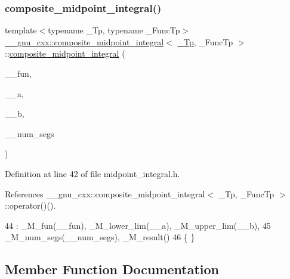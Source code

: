 \subsubsection{\texorpdfstring{composite\+\_\+midpoint\+\_\+integral()}{composite\_midpoint\_integral()}}
{\footnotesize\ttfamily template$<$typename \+\_\+\+Tp, typename \+\_\+\+Func\+Tp$>$ \\
\hyperlink{class____gnu__cxx_1_1composite__midpoint__integral}{\+\_\+\+\_\+gnu\+\_\+cxx\+::composite\+\_\+midpoint\+\_\+integral}$<$ \hyperlink{namespace____gnu__cxx_a3b19a9c800ca194374ef9172290f7d79}{\+\_\+\+Tp}, \+\_\+\+Func\+Tp $>$\+::\hyperlink{class____gnu__cxx_1_1composite__midpoint__integral}{composite\+\_\+midpoint\+\_\+integral} (\begin{DoxyParamCaption}\item[{\+\_\+\+Func\+Tp}]{\+\_\+\+\_\+fun,  }\item[{\hyperlink{namespace____gnu__cxx_a3b19a9c800ca194374ef9172290f7d79}{\+\_\+\+Tp}}]{\+\_\+\+\_\+a,  }\item[{\hyperlink{namespace____gnu__cxx_a3b19a9c800ca194374ef9172290f7d79}{\+\_\+\+Tp}}]{\+\_\+\+\_\+b,  }\item[{std\+::size\+\_\+t}]{\+\_\+\+\_\+num\+\_\+segs }\end{DoxyParamCaption})\hspace{0.3cm}{\ttfamily [inline]}}



Definition at line 42 of file midpoint\+\_\+integral.\+h.



References \+\_\+\+\_\+gnu\+\_\+cxx\+::composite\+\_\+midpoint\+\_\+integral$<$ \+\_\+\+Tp, \+\_\+\+Func\+Tp $>$\+::operator()().


\begin{DoxyCode}
44       : \_M\_fun(\_\_fun), \_M\_lower\_lim(\_\_a), \_M\_upper\_lim(\_\_b),
45         \_M\_num\_segs(\_\_num\_segs), \_M\_result()
46       \{ \}
\end{DoxyCode}


\subsection{Member Function Documentation}
\mbox{\label{class____gnu__cxx_1_1composite__midpoint__integral_a7eb1aeb6fba86c8c4dce818b83af4d2d}} 
